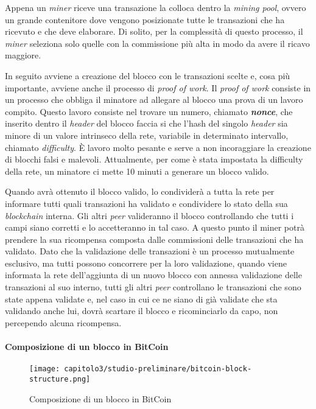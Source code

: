 Appena un \textit{miner} riceve una transazione la colloca dentro la \textit{mining pool}, ovvero un grande contenitore dove vengono posizionate tutte le transazioni che ha ricevuto e che deve elaborare. Di solito, per la complessità di questo processo, il \textit{miner} seleziona solo quelle con la commissione più alta in modo da avere il ricavo maggiore.

In seguito avviene a creazione del blocco con le transazioni scelte e, cosa più importante, avviene anche il processo di \textit{proof of work}. Il \textit{proof of work} consiste in un processo che obbliga il minatore ad allegare al blocco una prova di un lavoro compito. Questo lavoro consiste nel trovare un numero, chiamato \textit{\textbf{nonce}}, che inserito dentro il \textit{header} del blocco faccia si che l'hash del singolo \textit{header} sia minore di un valore intrinseco della rete, variabile in determinato intervallo, chiamato \textit{difficulty}. È lavoro molto pesante e serve a non incoraggiare la creazione di blocchi falsi e malevoli. Attualmente, per come è stata impostata la difficulty della rete, un minatore ci mette 10 minuti a generare un blocco valido.

Quando avrà ottenuto il blocco valido, lo condividerà a tutta la rete per informare tutti quali transazioni ha validato e condividere lo stato della sua \textit{blockchain} interna. Gli altri \textit{peer} valideranno il blocco controllando che tutti i campi siano corretti e lo accetteranno in tal caso. A questo punto il miner potrà prendere la sua ricompensa composta dalle commissioni delle transazioni che ha validato. Dato che la validazione delle transazioni è un processo mutualmente esclusivo, ma tutti possono concorrere per la loro validazione, quando viene informata la rete dell'aggiunta di un nuovo blocco con annessa validazione delle transazioni al suo interno, tutti gli altri \textit{peer} controllano le transazioni che sono state appena validate e, nel caso in cui ce ne siano di già validate che sta validando anche lui, dovrà scartare il blocco e ricominciarlo da capo, non percependo alcuna ricompensa.

\paragraph{Composizione di un blocco in BitCoin}
\begin{figure}[h!]
  \centering
  \texttt{[image: capitolo3/studio-preliminare/bitcoin-block-structure.png]}
  \caption{Composizione di un blocco in BitCoin}
\end{figure}

